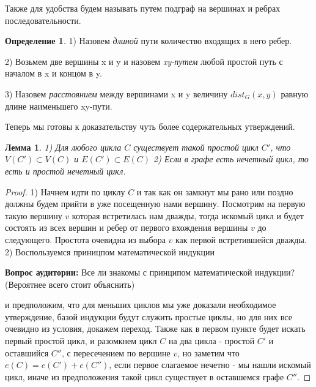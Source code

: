 \documentclass{article}
\newtheorem{lemma}{Лемма}
\theoremstyle{definition}
\newtheorem{definition}{Определение}[section]
\newcommand{\question}{\textbf{Вопрос аудитории: }}
\theoremstyle{remark}
\begin{document}
Также для удобства будем называть путем подграф на вершинах и ребрах последовательности. 

\begin{definition}
    1) Назовем \textit{длиной} пути количество входящих в него ребер.
    
    2) Возьмем две вершины x и y и назовем \textit{xy-путем} любой простой путь с началом в x и концом в y. 
    
    3) Назовем \textit{расстоянием} между вершинами x и y величину $dist_G(x,y)$ равную длине наименьшего xy-пути.  
\end{definition}

Теперь мы готовы к доказательству чуть более содержательных утверждений.

\begin{lemma} 
    1) Для любого цикла $C$ существует такой простой цикл $C'$, что $V(C') \subset V(C)$ и $E(C') \subset E(C)$
    2) Если в графе есть нечетный цикл, то есть и простой нечетный цикл. \label{lemma2}
\end{lemma}
\begin{proof}
    1) Начнем идти по циклу $C$ и так как он замкнут мы рано или поздно должны будем прийти в уже посещенную нами вершину. Посмотрим на первую такую вершину $v$ которая встретилась нам дважды, тогда искомый цикл и будет состоять из всех вершин и ребер от первого вхождения  вершины $v$ до следующего. Простота очевидна из выбора $v$ как первой встретившейся дважды.
    2) Воспользуемся приницпом математической индукции

    \question Все ли знакомы с принципом математической индукции? (Вероятнее всего стоит объяснить)

    и предположим, что для меньших циклов мы уже доказали необходимое утверждение, базой индукции будут служить простые циклы, но для них все очевидно из условия, докажем переход. Также как в первом пункте будет искать первый простой цикл, и разомкнем цикл $C$ на два цикла  - простой $C'$ и оставшийся $C''$, с пересечением по вершине $v$, но заметим что $e(C) = e(C') + e(C'')$, если первое слагаемое нечетно - мы нашли искомый цикл, иначе из предположения такой цикл существует в оставшемся графе $C''$.
\end{proof}
\end{document}
